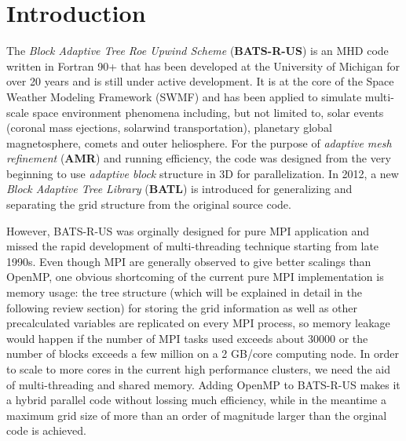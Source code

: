\documentclass[fleqn,11pt]{SelfArx} %
\affiliation{\textsuperscript{1}\textit{Department of Climate and Space Sciences and Engineering, University of Michigan, Ann Arbor, MI}} %
\affiliation{*\textbf{Corresponding author}: Hongyang Zhou, hyzhou@umich.edu} %
\begin{document}
\flushbottom %

\maketitle %

\tableofcontents %

\thispagestyle{empty} %


\section*{Introduction} %


The \emph{Block Adaptive Tree Roe Upwind Scheme} (\textbf{BATS-R-US}) is an MHD code written in Fortran 90+ that  has been developed at the University of Michigan for over 20 years and is still under active development. It is at the core of the Space Weather Modeling Framework (SWMF) and has been applied to simulate multi-scale space environment phenomena including, but not limited to, solar events (coronal mass ejections, solarwind transportation), planetary global magnetosphere, comets and outer heliosphere. For the purpose of \emph{adaptive mesh refinement} (\textbf{AMR}) and running efficiency, the code was designed from the very beginning to use \emph{adaptive block} structure in 3D for parallelization. In 2012, a new \emph{Block Adaptive Tree Library} (\textbf{BATL}) is introduced for generalizing and separating the grid structure from the original source code.

However, BATS-R-US was orginally designed for pure MPI application and missed the rapid development of multi-threading technique starting from late 1990s. Even though MPI are generally observed to give better scalings than OpenMP, one obvious shortcoming of the current pure MPI implementation is memory usage: the tree structure (which will be explained in detail in the following review section) for storing the grid information as well as other precalculated variables are replicated on every MPI process, so memory leakage would happen if the number of MPI tasks used exceeds about $30000$ or the number of blocks exceeds a few million on a 2 GB/core computing node. In order to scale to more cores in the current high performance clusters, we need the aid of multi-threading and shared memory. Adding OpenMP to BATS-R-US makes it a hybrid parallel code without lossing much efficiency, while in the meantime a maximum grid size of more than an order of magnitude larger than the orginal code is achieved.
\end{document}
